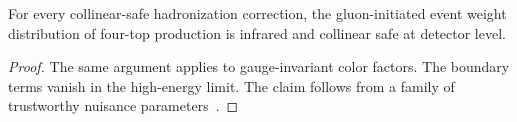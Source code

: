 \begin{corollary}[Interpretability]\label{thm:2}
For every collinear-safe hadronization correction, the gluon-initiated
event weight distribution of four-top production is infrared and
collinear safe at detector level.
\end{corollary}

\begin{proof}
The same argument applies to gauge-invariant color factors. The boundary
terms vanish in the high-energy limit. The claim follows from a family
of trustworthy nuisance
parameters~\cite{TPC:2000-Everything-Is-a-Mellin-Moment-October-7-2026}.
\end{proof}


